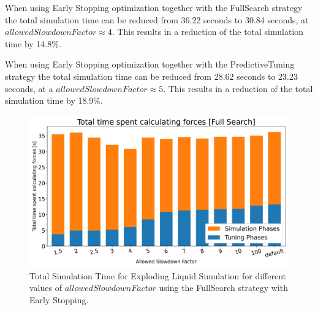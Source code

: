 \documentclass[conference]{IEEEtran}
\begin{document}
\begin{description}[style=nextline]
    \item[FullSearch (\autoref{fig:full_search})]
        When using Early Stopping optimization together with the FullSearch strategy the total simulation time
        can be reduced from 36.22 seconds to 30.84 seconds, at $allowedSlowdownFactor \approx4$. This results in a reduction of the total simulation time by 14.8\%.
    \item[PredictiveTuning (\autoref{fig:predictive_tuning})]
        When using Early Stopping optimization together with the PredictiveTuning strategy the total simulation time can be reduced from 28.62 seconds to 23.23 seconds, at a $allowedSlowdownFactor \approx5$. This results in a reduction of the total simulation time by 18.9\%.
\end{description}

\begin{figure}[H]
    \centering

    \includegraphics[width=\columnwidth]{../data/explodingLiquid/cluster/fullSearch/analytics/total_time_average.png}

    \caption{Total Simulation Time for Exploding Liquid Simulation for different values of $allowedSlowdownFactor$ using the FullSearch strategy with Early Stopping.}
    \label{fig:full_search}
\end{figure}
\end{document}
